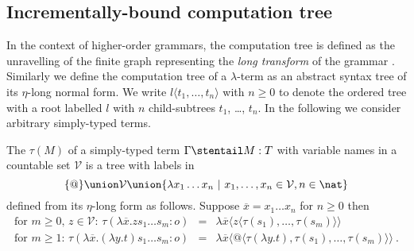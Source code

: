 \subsection*{Incrementally-bound computation tree}
In the context of higher-order grammars, the computation tree is
defined as the unravelling of the finite graph representing the \emph{long
transform} of the grammar \cite{OngLics2006}. Similarly we define the computation tree of
a $\lambda$-term as an abstract syntax tree of its $\eta$-long
normal form.  We write $l\langle t_1, \ldots, t_n \rangle$ with $n
\geq 0$ to denote the ordered tree with a root labelled $l$ with $n$
child-subtrees $t_1$, \ldots, $t_n$. In the following we consider arbitrary
simply-typed terms.

\begin{definition}\rm
\label{dfn:comptree}
  The  $\tau(M)$ of a simply-typed term
  $\Gamma \stentail M:T$ with variable names in a countable set
  $\mathcal{V}$ is a tree with labels in $$ \{ @ \} \union \mathcal{V}
  \union \{ \lambda x_1 \ldots x_n \ | \ x_1 ,\ldots, x_n \in
  \mathcal{V}, n\in\nat \}$$ defined from its $\eta$-long form as follows. Suppose $\overline{x} = x_1 \ldots x_n$ for $n\geq 0$ then
\begin{eqnarray*}
  \mbox{for $m\geq 0$, $z \in \mathcal{V}$: } \tau(\lambda \overline{x} . z s_1 \ldots s_m : o) &=& \lambda \overline{x} \langle z \langle\tau(s_1),\ldots,\tau(s_m)\rangle\rangle \\
  \mbox{for $m \geq 1$: } \tau(\lambda \overline{x} . (\lambda y.t) s_1 \ldots s_m :o) &=& \lambda \overline{x} \langle @ \langle \tau(\lambda y.t),\tau(s_1),\ldots,\tau(s_m) \rangle \rangle \ .
\end{eqnarray*}
\end{definition}

